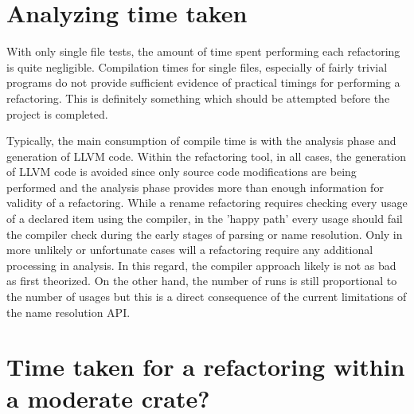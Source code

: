 \section{Analyzing time taken}
With only single file tests, the amount of time spent performing each refactoring is quite negligible. Compilation times for single files, especially of fairly trivial programs do not provide sufficient evidence of practical timings for performing a refactoring. This is definitely something which should be attempted before the project is completed. 

Typically, the main consumption of compile time is with the analysis phase and generation of LLVM code. Within the refactoring tool, in all cases, the generation of LLVM code is avoided since only source code modifications are being performed and the analysis phase provides more than enough information for validity of a refactoring. While a rename refactoring requires checking every usage of a declared item using the compiler, in the 'happy path' every usage should fail the compiler check during the early stages of parsing or name resolution. Only in more unlikely or unfortunate cases will a refactoring require any additional processing in analysis. In this regard, the compiler approach likely is not as bad as first theorized. On the other hand, the number of runs is still proportional to the number of usages but this is a direct consequence of the current limitations of the name resolution API.

\section{Time taken for a refactoring within a moderate crate?}